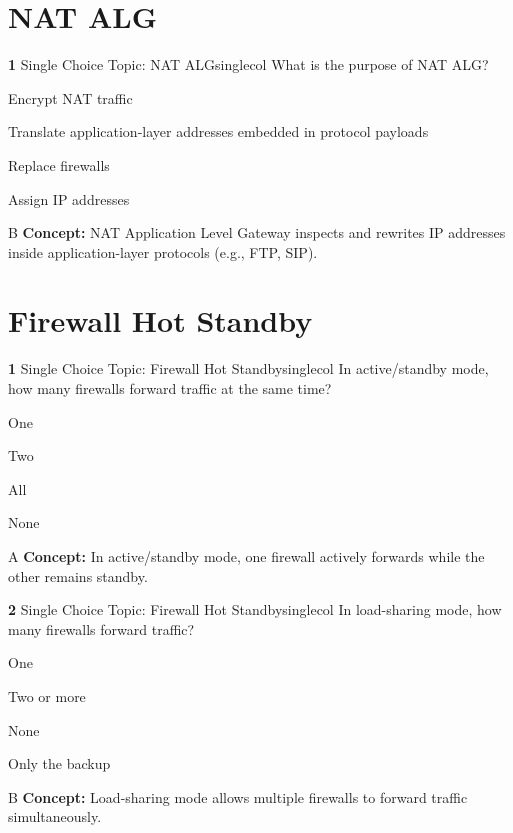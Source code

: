 \documentclass[10pt,a4paper]{article}
\begin{document}
\section{NAT ALG}
\begin{qcard}{\color{white}\textbf{1} \hfill \small Single Choice \textbar{} Topic: NAT ALG}{singlecol}
What is the purpose of NAT ALG?

\begin{qoptions}
\item Encrypt NAT traffic
\item Translate application-layer addresses embedded in protocol payloads
\item Replace firewalls
\item Assign IP addresses
\end{qoptions}
\begin{explainbox}{B}
\textbf{Concept:} NAT Application Level Gateway inspects and rewrites IP addresses inside application-layer protocols (e.g., FTP, SIP).
\end{explainbox}
\end{qcard}

\section{Firewall Hot Standby}
\begin{qcard}{\color{white}\textbf{1} \hfill \small Single Choice \textbar{} Topic: Firewall Hot Standby}{singlecol}
In active/standby mode, how many firewalls forward traffic at the same time?

\begin{qoptions}
\item One
\item Two
\item All
\item None
\end{qoptions}
\begin{explainbox}{A}
\textbf{Concept:} In active/standby mode, one firewall actively forwards while the other remains standby.
\end{explainbox}
\end{qcard}

\begin{qcard}{\color{white}\textbf{2} \hfill \small Single Choice \textbar{} Topic: Firewall Hot Standby}{singlecol}
In load-sharing mode, how many firewalls forward traffic?

\begin{qoptions}
\item One
\item Two or more
\item None
\item Only the backup
\end{qoptions}
\begin{explainbox}{B}
\textbf{Concept:} Load-sharing mode allows multiple firewalls to forward traffic simultaneously.
\end{explainbox}
\end{qcard}
\end{document}
